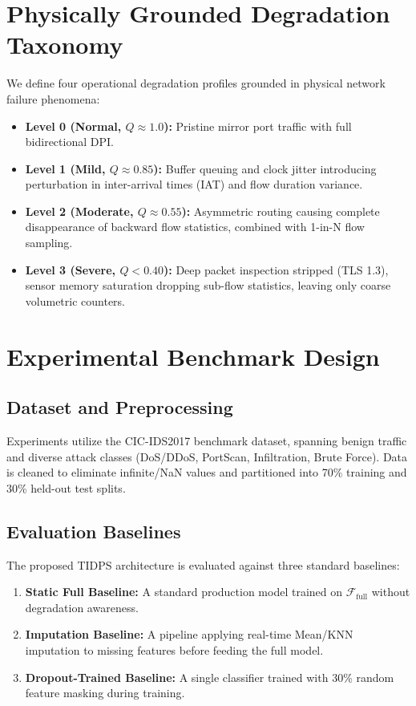 \documentclass[conference]{IEEEtran}
\begin{document}
\section{Physically Grounded Degradation Taxonomy}
We define four operational degradation profiles grounded in physical network failure phenomena:
\begin{itemize}
    \item \textbf{Level 0 (Normal, $Q \approx 1.0$):} Pristine mirror port traffic with full bidirectional DPI.
    \item \textbf{Level 1 (Mild, $Q \approx 0.85$):} Buffer queuing and clock jitter introducing perturbation in inter-arrival times (IAT) and flow duration variance.
    \item \textbf{Level 2 (Moderate, $Q \approx 0.55$):} Asymmetric routing causing complete disappearance of backward flow statistics, combined with 1-in-N flow sampling.
    \item \textbf{Level 3 (Severe, $Q < 0.40$):} Deep packet inspection stripped (TLS 1.3), sensor memory saturation dropping sub-flow statistics, leaving only coarse volumetric counters.
\end{itemize}

\section{Experimental Benchmark Design}
\subsection{Dataset and Preprocessing}
Experiments utilize the CIC-IDS2017 benchmark dataset, spanning benign traffic and diverse attack classes (DoS/DDoS, PortScan, Infiltration, Brute Force). Data is cleaned to eliminate infinite/NaN values and partitioned into 70\% training and 30\% held-out test splits.

\subsection{Evaluation Baselines}
The proposed TIDPS architecture is evaluated against three standard baselines:
\begin{enumerate}
    \item \textbf{Static Full Baseline:} A standard production model trained on $\mathcal{F}_{\text{full}}$ without degradation awareness.
    \item \textbf{Imputation Baseline:} A pipeline applying real-time Mean/KNN imputation to missing features before feeding the full model.
    \item \textbf{Dropout-Trained Baseline:} A single classifier trained with 30\% random feature masking during training.
\end{enumerate}
\end{document}
